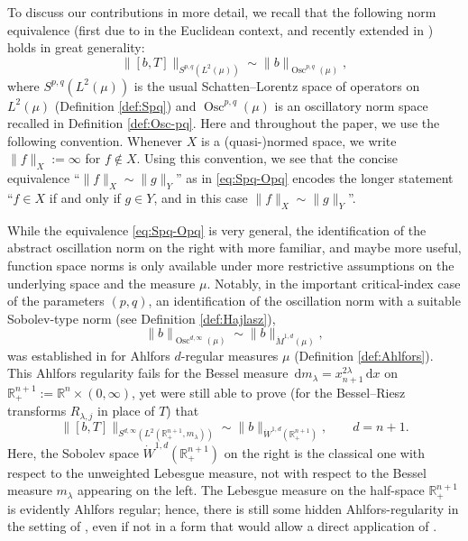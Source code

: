 \documentclass[reqno]{amsart}
\newcommand{\ud}[0]{\,\mathrm{d}}
\newcommand{\Norm}[2]{\|#1\|_{#2}}
\newcommand{\R}{\mathbb{R}}
\theoremstyle{plain}
\theoremstyle{definition}
\theoremstyle{remark}
\begin{document}
To discuss our contributions in more detail, we recall that the following norm equivalence (first due to \cite{RS:NWO} in the Euclidean context, and recently extended in \cite{Hyt:Sp}) holds in great generality:
\begin{equation}\label{eq:Spq-Opq}
  \Norm{[b,T]}{S^{p,q}(L^2(\mu))}\sim\Norm{b}{\operatorname{Osc}^{p,q}(\mu)},
\end{equation}
where $S^{p,q}(L^2(\mu))$ is the usual Schatten--Lorentz space of operators on $L^2(\mu)$ (Definition \ref{def:Spq}) and $\operatorname{Osc}^{p,q}(\mu)$ is an oscillatory norm space recalled in Definition \ref{def:Osc-pq}. Here and throughout the paper, we use the following convention. Whenever $X$ is a (quasi-)normed space, we write $\Norm{f}{X}:=\infty$ for $f\notin X$. Using this convention, we see that the concise equivalence ``$\Norm{f}{X}\sim\Norm{g}{Y}$'' as in \eqref{eq:Spq-Opq} encodes the longer statement ``$f\in X$ if and only if $g\in Y$, and in this case $\Norm{f}{X}\sim\Norm{g}{Y}$''.

While the equivalence \eqref{eq:Spq-Opq} is very general, the identification of the abstract oscillation norm on the right with more familiar, and maybe more useful, function space norms is only available under more restrictive assumptions on the underlying space and the measure $\mu$. Notably, in the important critical-index case of the parameters $(p,q)$, an identification of the oscillation norm with a suitable Sobolev-type norm (see Definition \ref{def:Hajlasz}),
\begin{equation*}
  \Norm{b}{\operatorname{Osc}^{d,\infty}(\mu)}\sim\Norm{b}{\dot M^{1,d}(\mu)},
\end{equation*}
was established in \cite{Hyt:Sp,HK:W1p} for Ahlfors $d$-regular measures $\mu$ (Definition \ref{def:Ahlfors}). This Ahlfors regularity fails for the Bessel measure $\ud m_\lambda=x_{n+1}^{2\lambda}\ud x$ on $\R^{n+1}_+:=\R^n\times(0,\infty)$, yet \cite{FLSZ} were still able to prove (for the Bessel--Riesz transforms $R_{\lambda,j}$ in place of $T$) that
\begin{equation*}
  \Norm{[b,T]}{S^{d,\infty}(L^2(\R_+^{n+1},m_\lambda))}\sim\Norm{b}{\dot W^{1,d}(\R_+^{n+1})},
  \qquad d=n+1.
\end{equation*}
Here, the Sobolev space $\dot W^{1,d}(\R_+^{n+1})$ on the right is the classical one with respect to the unweighted Lebesgue measure, not with respect to the Bessel measure $m_\lambda$ appearing on the left. The Lebesgue measure on the half-space $\R_+^{n+1}$ is evidently Ahlfors regular; hence, there is still some hidden Ahlfors-regularity in the setting of \cite{FLSZ}, even if not in a form that would allow a direct application of \cite{Hyt:Sp,HK:W1p}.
\end{document}

